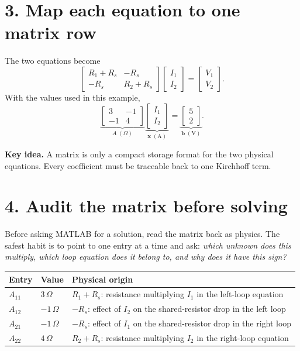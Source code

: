 \documentclass[11pt,a4paper]{article}
\begin{document}
\section*{3. Map each equation to one matrix row}
The two equations become
\[
\begin{bmatrix}
R_1+R_s & -R_s\\
-R_s & R_2+R_s
\end{bmatrix}
\begin{bmatrix}I_1\\I_2\end{bmatrix}
=
\begin{bmatrix}V_1\\V_2\end{bmatrix}.
\]
With the values used in this example,
\[
\underbrace{\begin{bmatrix}3&-1\\-1&4\end{bmatrix}}_{A\;(\Omega)}
\underbrace{\begin{bmatrix}I_1\\I_2\end{bmatrix}}_{\mathbf{x}\;(\mathrm A)}
=
\underbrace{\begin{bmatrix}5\\2\end{bmatrix}}_{\mathbf b\;(\mathrm V)}.
\]

\begin{keybox}\textbf{Key idea.} A matrix is only a compact storage format for the two physical equations. Every coefficient must be traceable back to one Kirchhoff term.\end{keybox}

\section*{4. Audit the matrix before solving}
Before asking MATLAB for a solution, read the matrix back as physics. The safest habit is to point to one entry at a time and ask: \emph{which unknown does this multiply, which loop equation does it belong to, and why does it have this sign?}

\begin{center}
\small
\begin{tabular}{>{\raggedright\arraybackslash}p{.15\linewidth}>{\centering\arraybackslash}p{.15\linewidth}>{\raggedright\arraybackslash}p{.54\linewidth}}
\toprule
\textbf{Entry} & \textbf{Value} & \textbf{Physical origin}\\
\midrule
$A_{11}$ & $3\,\Omega$ & $R_1+R_s$: resistance multiplying $I_1$ in the left-loop equation\\
$A_{12}$ & $-1\,\Omega$ & $-R_s$: effect of $I_2$ on the shared-resistor drop in the left loop\\
$A_{21}$ & $-1\,\Omega$ & $-R_s$: effect of $I_1$ on the shared-resistor drop in the right loop\\
$A_{22}$ & $4\,\Omega$ & $R_2+R_s$: resistance multiplying $I_2$ in the right-loop equation\\
\bottomrule
\end{tabular}
\end{center}
\end{document}
